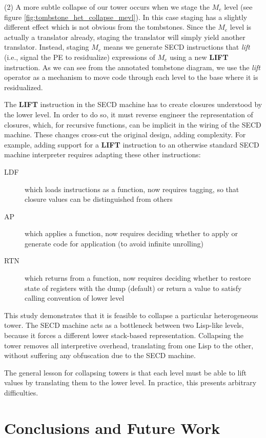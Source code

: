 \documentclass[sigplan,anonymous,review]{acmart}
\newcommand{\mevl}{$M_{e}$}
\theoremstyle{definition}
\begin{document}
(2) A more subtle collapse of our tower occurs when we stage the \mevl{} level (see figure \ref{fig:tombstone_het_collapse_mevl}). In this case staging has a slightly different effect which is not obvious from the tombstones. Since the \mevl{} level is actually a translator already, staging the translator will simply yield another translator. Instead, staging \mevl{} means we generate SECD instructions that \textit{lift} (i.e., signal the PE to residualize) expressions of \mevl{} using a new \textbf{LIFT} instruction. As we can see from the annotated tombstone diagram, we use the \textit{lift} operator as a mechanism to move code through each level to the base where it is residualized.

The \textbf{LIFT} instruction in the SECD machine has to create
closures understood by the lower level. In order to do so, it must
reverse engineer the representation of closures, which, for recursive
functions, can be implicit in the wiring of the SECD machine. These changes cross-cut the original design, adding complexity.
For example, adding support for a \textbf{LIFT} instruction to an otherwise standard SECD machine interpreter
requires adapting these other instructions:
\begin{description}
\item [LDF] which loads instructions as a function, now requires tagging, so that closure values can be distinguished from others
\item [AP ] which applies a function, now requires deciding whether to apply or generate code for application (to avoid infinite unrolling)
\item [RTN] which returns from a function, now requires deciding whether to restore state of registers with the dump (default) or return a value to satisfy calling convention of lower level
\end{description}

This study demonstrates that it is feasible to collapse a particular
heterogeneous tower. The SECD machine acts as a bottleneck
between two Lisp-like levels, because it forces a different lower
stack-based representation. Collapsing the tower removes
all interpretive overhead, translating from one Lisp to the other,
without suffering any obfuscation due to the SECD machine.

The general lesson for collapsing towers is that each level must be
able to lift values by translating them to the lower level. In
practice, this presents arbitrary difficulties.

\section{Conclusions and Future Work}\label{sec:conc}
\end{document}
